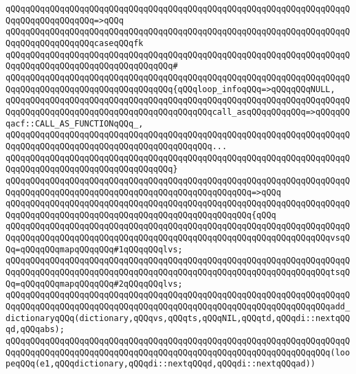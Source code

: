 \verb|qQQqqQQqqQQqqQQqqQQqqQQqqQQqqQQqqQQqqQQqqQQqqQQqqQQqqQQqqQQqqQQqqQQqqQQqqQQqqQQqqQQqqQQq=>qQQq|\newline
\verb|qQQqqQQqqQQqqQQqqQQqqQQqqQQqqQQqqQQqqQQqqQQqqQQqqQQqqQQqqQQqqQQqqQQqqQQqqQQqqQQqqQQqqQQqcaseqQQqfk|\newline
\verb|qQQqqQQqqQQqqQQqqQQqqQQqqQQqqQQqqQQqqQQqqQQqqQQqqQQqqQQqqQQqqQQqqQQqqQQqqQQqqQQqqQQqqQQqqQQqqQQqqQQqqQQq#|\newline
\verb|qQQqqQQqqQQqqQQqqQQqqQQqqQQqqQQqqQQqqQQqqQQqqQQqqQQqqQQqqQQqqQQqqQQqqQQqqQQqqQQqqQQqqQQqqQQqqQQqqQQqqQQq{qQQqloop_infoqQQq=>qQQqqQQqNULL,|\newline
\verb|qQQqqQQqqQQqqQQqqQQqqQQqqQQqqQQqqQQqqQQqqQQqqQQqqQQqqQQqqQQqqQQqqQQqqQQqqQQqqQQqqQQqqQQqqQQqqQQqqQQqqQQqqQQqqQQqcall_asqQQqqQQqqQQq=>qQQqqQQqacf::CALL_AS_FUNCTIONqQQq_,|\newline
\verb|qQQqqQQqqQQqqQQqqQQqqQQqqQQqqQQqqQQqqQQqqQQqqQQqqQQqqQQqqQQqqQQqqQQqqQQqqQQqqQQqqQQqqQQqqQQqqQQqqQQqqQQqqQQqqQQq...|\newline
\verb|qQQqqQQqqQQqqQQqqQQqqQQqqQQqqQQqqQQqqQQqqQQqqQQqqQQqqQQqqQQqqQQqqQQqqQQqqQQqqQQqqQQqqQQqqQQqqQQqqQQqqQQq}|\newline
\verb|qQQqqQQqqQQqqQQqqQQqqQQqqQQqqQQqqQQqqQQqqQQqqQQqqQQqqQQqqQQqqQQqqQQqqQQqqQQqqQQqqQQqqQQqqQQqqQQqqQQqqQQqqQQqqQQqqQQqqQQq=>qQQq|\newline
\verb|qQQqqQQqqQQqqQQqqQQqqQQqqQQqqQQqqQQqqQQqqQQqqQQqqQQqqQQqqQQqqQQqqQQqqQQqqQQqqQQqqQQqqQQqqQQqqQQqqQQqqQQqqQQqqQQqqQQqqQQq{qQQq|\newline
\verb|qQQqqQQqqQQqqQQqqQQqqQQqqQQqqQQqqQQqqQQqqQQqqQQqqQQqqQQqqQQqqQQqqQQqqQQqqQQqqQQqqQQqqQQqqQQqqQQqqQQqqQQqqQQqqQQqqQQqqQQqqQQqqQQqqQQqqQQqvsqQQq=qQQqqQQqmapqQQqqQQq#1qQQqqQQqlvs;|\newline
\verb|qQQqqQQqqQQqqQQqqQQqqQQqqQQqqQQqqQQqqQQqqQQqqQQqqQQqqQQqqQQqqQQqqQQqqQQqqQQqqQQqqQQqqQQqqQQqqQQqqQQqqQQqqQQqqQQqqQQqqQQqqQQqqQQqqQQqqQQqtsqQQq=qQQqqQQqmapqQQqqQQq#2qQQqqQQqlvs;|\newline
\newline
\verb|qQQqqQQqqQQqqQQqqQQqqQQqqQQqqQQqqQQqqQQqqQQqqQQqqQQqqQQqqQQqqQQqqQQqqQQqqQQqqQQqqQQqqQQqqQQqqQQqqQQqqQQqqQQqqQQqqQQqqQQqqQQqqQQqqQQqqQQqadd_dictionaryqQQq(dictionary,qQQqvs,qQQqts,qQQqNIL,qQQqtd,qQQqdi::nextqQQqd,qQQqabs);|\newline
\newline
\verb|qQQqqQQqqQQqqQQqqQQqqQQqqQQqqQQqqQQqqQQqqQQqqQQqqQQqqQQqqQQqqQQqqQQqqQQqqQQqqQQqqQQqqQQqqQQqqQQqqQQqqQQqqQQqqQQqqQQqqQQqqQQqqQQqqQQqqQQq(loopeqQQq(e1,qQQqdictionary,qQQqdi::nextqQQqd,qQQqdi::nextqQQqad))|\newline
